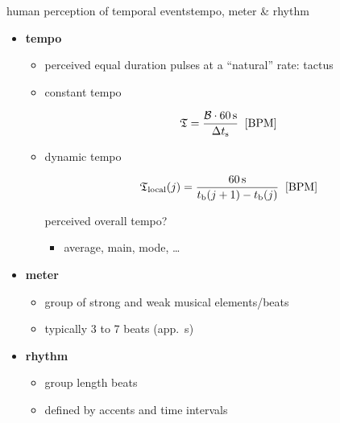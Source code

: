         \begin{frame}{human perception of temporal events}{tempo, meter \& rhythm}
            \begin{itemize}
                \item	\textbf{tempo}
                    \begin{itemize}
                        \item<2->	perceived equal duration pulses at a ``natural'' rate: tactus
                        
                        \item<3->	constant tempo
                            \begin{footnotesize}
                            \begin{equation*}\label{eq:tempo_mean}
                                \mathfrak{T} = \frac{ \mathcal{B}\cdot \unit[60]{s}}{\Delta t_\mathrm{s}}\;\; [\unit{BPM}] 
                            \end{equation*}
                            \end{footnotesize}
                        \item<4->	dynamic tempo
                            \begin{footnotesize}
                            \begin{equation*}
                                \mathfrak{T}_\mathrm{local}(j) = \frac{\unit[60]{s}}{t_\mathrm{b}(j+1)-t_\mathrm{b}(j)}\;\; [\unit{BPM}] 
                            \end{equation*}
                            \end{footnotesize}
                            
                            \pause
                            perceived overall tempo?
                            \begin{itemize}
                                \item	average, main, mode, \ldots
                            \end{itemize}
                    \end{itemize}
                \item<6->	\textbf{meter}
                    \begin{itemize}
                        \item	group of strong and weak musical elements/beats
                        \pause
                        \item	typically 3 to 7 beats (app.\ \unit[5]{s})
                    \end{itemize}
                
                \item<7->	\textbf{rhythm}
                    \begin{itemize}
                        \item	group length \unit[1-8]{beats}
                        \item	defined by accents and time intervals
                    \end{itemize}
            \end{itemize}
        \end{frame}

